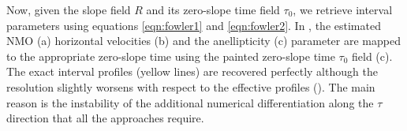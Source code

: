 Now, given the slope field $R$ and its zero-slope time field $\tau
_{0}$, we retrieve interval parameters using equations
\ref{eqn:fowler1} and \ref{eqn:fowler2}. In , the
estimated NMO (a) horizontal velocities (b) and the anellipticity (c)
parameter are mapped to the appropriate zero-slope time using the
painted zero-slope time $\tau _{0}$ field (c).
The exact interval profiles (yellow lines) are recovered 
perfectly although the resolution slightly worsens with respect to the
effective profiles (). The main reason is the instability
of the additional numerical differentiation along the $\tau $
direction that all the approaches require.

